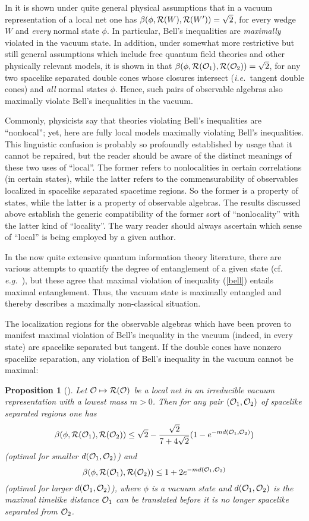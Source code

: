 \documentclass[12pt]{article}
\newtheorem{prop}[theorem]{Proposition}
\newcommand{\ie}{{\it i.e.\ }}
\newcommand{\eg}{{\it e.g.\ }}
\def\Os{{\cal O}}
\def\Rs{{\cal R}}
\begin{document}
     In \cite{SW5} it is shown under quite general physical assumptions 
that in a vacuum representation of a local net one has 
$\beta(\phi,\Rs(W),\Rs(W')) = \sqrt{2}$, for every wedge $W$ and 
{\it every} normal state $\phi$. In particular, Bell's inequalities 
are {\it maximally} violated in the vacuum state. In addition,
under somewhat more restrictive but still general assumptions which include
free quantum field theories and other physically relevant models, it is
shown in \cite{SW5} that 
$\beta(\phi,\Rs(\Os_1),\Rs(\Os_2)) = \sqrt{2}$, for
any two spacelike separated double cones whose closures intersect
(\ie tangent double cones) and {\it all} normal states $\phi$. Hence, such
pairs of observable algebras also maximally violate Bell's inequalities
in the vacuum.
     
     Commonly, physicists say that theories violating Bell's
inequalities are ``nonlocal''; yet, here are fully local models
maximally violating Bell's inequalities. This linguistic confusion is
probably so profoundly established by usage that it cannot be
repaired, but the reader should be aware of the distinct meanings of
these two uses of ``local''. The former refers to nonlocalities in
certain correlations (in certain states), while the latter refers to
the commensurability of observables localized in spacelike separated
spacetime regions. So the former is a property of states, while
the latter is a property of observable algebras.  The results
discussed above establish the generic compatibility of the former sort
of ``nonlocality'' with the latter kind of ``locality''. The wary
reader should always ascertain which sense of ``local'' is being
employed by a given author.

     In the now quite extensive quantum information theory literature,
there are various attempts to quantify the degree of entanglement of a
given state (cf. \eg \cite{Hor,Key}), but these agree that maximal
violation of inequality (\ref{bell}) entails maximal
entanglement. Thus, the vacuum state is maximally entangled and
thereby describes a maximally non-classical situation.

     The localization regions for the observable algebras which have
been proven to manifest maximal violation of Bell's inequality in the
vacuum (indeed, in every state) are spacelike separated but
tangent. If the double cones have nonzero spacelike separation, any
violation of Bell's inequality in the vacuum cannot be maximal:

\begin{prop} [\cite{SW6,SW1,SW2}] Let $\Os \mapsto \Rs(\Os)$ be a local
net in an irreducible vacuum representation with a lowest mass
$m > 0$. Then for any pair $(\Os_1,\Os_2)$ of spacelike separated
regions one has
%
$$\beta(\phi,\Rs(\Os_1),\Rs(\Os_2)) \leq \sqrt{2} - 
\frac{\sqrt{2}}{7 + 4\sqrt{2}}(1 - e^{-md(\Os_1,\Os_2)}) $$
%
(optimal for smaller $d(\Os_1,\Os_2)$) and
%
$$\beta(\phi,\Rs(\Os_1),\Rs(\Os_2)) \leq 1 + 2 e^{-md(\Os_1,\Os_2)} $$
%
(optimal for larger $d(\Os_1,\Os_2)$), where $\phi$ is a vacuum state 
and $d(\Os_1,\Os_2)$ is the maximal timelike distance $\Os_1$ can be 
translated before it is no longer spacelike separated from $\Os_2$.
\end{prop}
\end{document}
